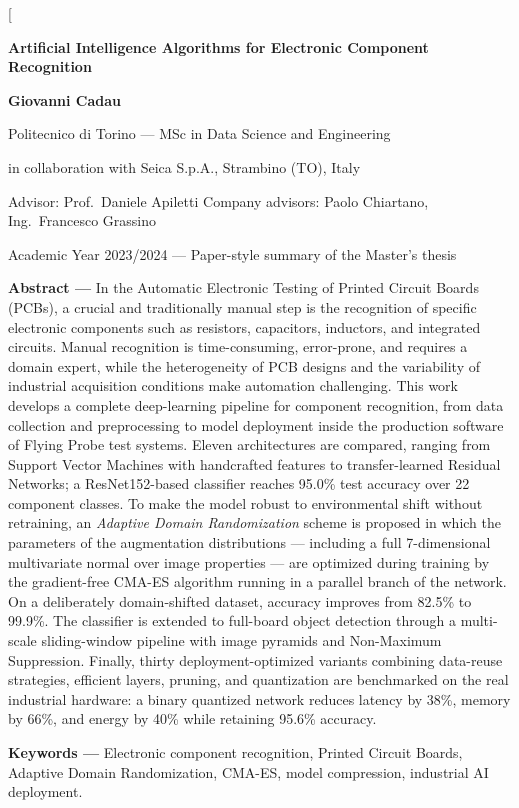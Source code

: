 \documentclass[10pt,twocolumn,a4paper]{article}
\begin{document}
\twocolumn[
\begin{center}
{\LARGE\bfseries Artificial Intelligence Algorithms for Electronic Component Recognition\par}
\vspace{10pt}
{\large\bfseries Giovanni Cadau\par}
\vspace{3pt}
{\normalsize Politecnico di Torino --- MSc in Data Science and Engineering\par}
{\normalsize in collaboration with Seica S.p.A., Strambino (TO), Italy\par}
\vspace{3pt}
{\small Advisor: Prof.~Daniele Apiletti \quad Company advisors: Paolo Chiartano, Ing.~Francesco Grassino\par}
\vspace{3pt}
{\small Academic Year 2023/2024 --- Paper-style summary of the Master's thesis\par}
\end{center}
\vspace{8pt}
\begin{center}
\begin{minipage}{0.92\textwidth}
\small
\textbf{Abstract ---}
In the Automatic Electronic Testing of Printed Circuit Boards (PCBs), a crucial and traditionally manual step is the recognition of specific electronic components such as resistors, capacitors, inductors, and integrated circuits. Manual recognition is time-consuming, error-prone, and requires a domain expert, while the heterogeneity of PCB designs and the variability of industrial acquisition conditions make automation challenging. This work develops a complete deep-learning pipeline for component recognition, from data collection and preprocessing to model deployment inside the production software of Flying Probe test systems. Eleven architectures are compared, ranging from Support Vector Machines with handcrafted features to transfer-learned Residual Networks; a ResNet152-based classifier reaches 95.0\% test accuracy over 22 component classes. To make the model robust to environmental shift without retraining, an \emph{Adaptive Domain Randomization} scheme is proposed in which the parameters of the augmentation distributions --- including a full 7-dimensional multivariate normal over image properties --- are optimized during training by the gradient-free CMA-ES algorithm running in a parallel branch of the network. On a deliberately domain-shifted dataset, accuracy improves from 82.5\% to 99.9\%. The classifier is extended to full-board object detection through a multi-scale sliding-window pipeline with image pyramids and Non-Maximum Suppression. Finally, thirty deployment-optimized variants combining data-reuse strategies, efficient layers, pruning, and quantization are benchmarked on the real industrial hardware: a binary quantized network reduces latency by 38\%, memory by 66\%, and energy by 40\% while retaining 95.6\% accuracy.\par\vspace{2pt}
\textbf{Keywords ---} Electronic component recognition, Printed Circuit Boards, Adaptive Domain Randomization, CMA-ES, model compression, industrial AI deployment.
\end{minipage}
\end{center}
\end{document}
